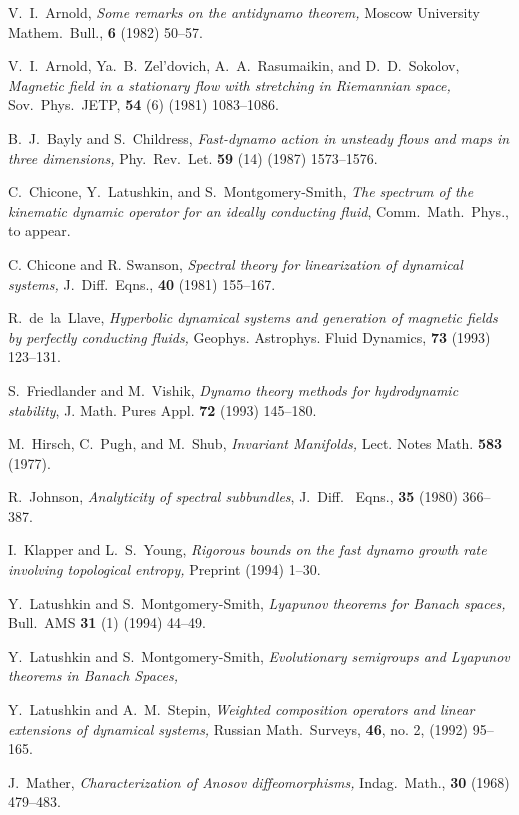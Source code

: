 \begin{thebibliography}{XXXX}

 V.~I.~Arnold,
{\em Some remarks on the antidynamo theorem,}
Moscow University Mathem.~Bull., {\bf 6} (1982) 50--57.
 
 V.~I.~Arnold, Ya.~B.~Zel'dovich, A.~A.~Rasumaikin, and
D.~D.~Sokolov, {\em Magnetic field in a stationary flow with
stretching in Riemannian space,} Sov.~Phys.~JETP, {\bf 54} (6)
(1981) 1083--1086.
 
 B.~J.~Bayly and S.~Childress,
{\em Fast-dynamo action in unsteady flows and maps in three
dimensions,}
Phy.~Rev.~Let. {\bf 59} (14) (1987) 1573--1576.
 

C.~Chicone, Y.~Latushkin, and S.~Montgomery-Smith,
 {\it The spectrum of the
kinematic dynamic operator for an ideally conducting fluid\/}, Comm.\
Math.\ Phys., to appear.
 
 C. Chicone and R. Swanson,
{\em Spectral theory for linearization of dynamical systems,}
J.~Diff.~Eqns.,  {\bf 40} (1981) 155--167.

  R.~de~la~Llave,
{\em Hyperbolic dynamical systems and
generation of magnetic fields by perfectly conducting fluids,}
Geophys. Astrophys. Fluid Dynamics,
{\bf 73} (1993) 123--131.
 
 S.~Friedlander and M.~Vishik,
{\em Dynamo theory methods for hydrodynamic stability},
J. Math. Pures Appl. {\bf 72} (1993) 145--180.

 M.~Hirsch, C.~Pugh, and M.~Shub,
{\em Invariant Manifolds,}
Lect. Notes Math. {\bf 583} (1977).
 
 R.~Johnson,
{\em Analyticity of spectral subbundles},
J.~Diff.~ Eqns., {\bf 35} (1980) 366--387.

 I.~Klapper and L.~S.~Young,
{\em Rigorous bounds on the fast dynamo growth rate involving
topological entropy,} Preprint (1994) 1--30.
 
 Y.~Latushkin and  S.~Montgomery-Smith,
{\em Lyapunov theorems for Banach spaces,}
Bull.~AMS {\bf 31} (1) (1994) 44--49.

 Y.~Latushkin and  S.~Montgomery-Smith,
{\em Evolutionary semigroups and Lyapunov theorems in Banach Spaces,}
 
 Y.~Latushkin and A.~M.~Stepin,
{\em Weighted composition
operators and linear extensions of dynamical systems,}
Russian Math.~Surveys, {\bf 46}, no. 2, (1992) 95--165.
 
 J.~Mather,
{\em Characterization of Anosov diffeomorphisms,}
Indag.~Math., {\bf 30} (1968) 479--483.
 

\end{thebibliography}
